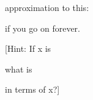 approximation to this:







if you go on forever.



[Hint: If x is






what is






in terms of x?]

